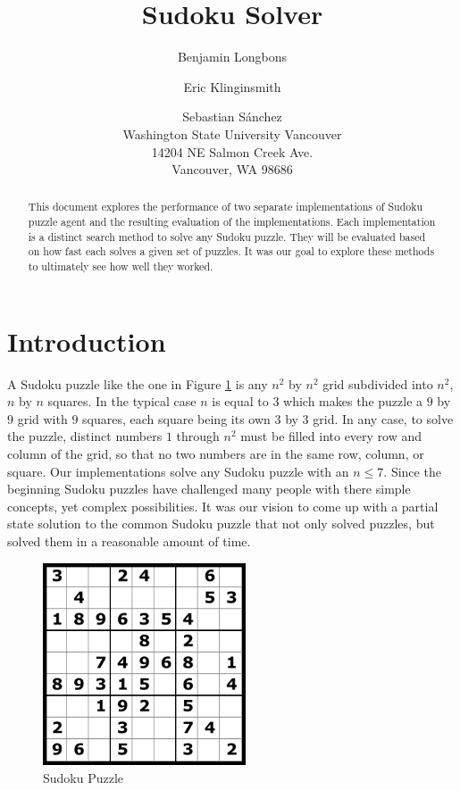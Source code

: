\documentclass[letterpaper]{article}
\begin{document}
\title{Sudoku Solver}
\author{
	Benjamin Longbons\and
    Eric Klinginsmith \and
    Sebastian S\'{a}nchez \\
Washington State University Vancouver \\
14204 NE Salmon Creek Ave. \\
Vancouver, WA 98686
}

\maketitle
\begin{abstract}
This document explores the performance of two separate implementations of Sudoku puzzle agent and the resulting evaluation of the implementations. Each implementation is a distinct search method to solve any Sudoku puzzle. They will be evaluated based on how fast each solves a given set of puzzles. It was our goal to explore these methods to ultimately see how well they worked.
\end{abstract}

\section{Introduction}
A Sudoku puzzle like the one in Figure \ref{fig:sudoku-puzzle} is any $ n^{2} $ by $ n^{2} $ grid subdivided into $ n^{2} $, $n$ by $n$ squares. In the typical case $ n $ is equal to $3$ which makes the puzzle a $9$ by $9$ grid with $9$ squares, each square being its own $3$ by $3$ grid. In any case, to solve the puzzle, distinct numbers $1$ through $ n^{2} $ must be filled into every row and column of the grid, so that no two numbers are in the same row, column, or square. Our implementations solve any Sudoku puzzle with an $n \le 7$. Since the beginning Sudoku puzzles have challenged many people with there simple concepts, yet complex possibilities. It was our vision to come up with a partial state solution to the common Sudoku puzzle that not only solved puzzles, but solved them in a reasonable amount of time.

\begin{figure}[h]
	\centering
	\includegraphics[width=60mm]{./Sudoku-games.png}
	\caption{Sudoku Puzzle}
	\label{fig:sudoku-puzzle}
\end{figure}
\end{document}
